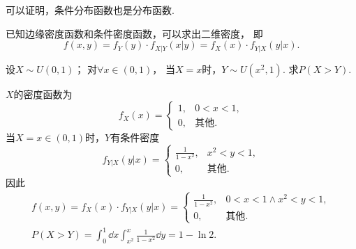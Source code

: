 可以证明，条件分布函数也是分布函数.

\begin{corollary}
已知边缘密度函数和条件密度函数，可以求出二维密度，
即\begin{equation*}
	f(x,y) = f_Y(y) \cdot f_{X \vert Y}(x \vert y)
	= f_X(x) \cdot f_{Y \vert X}(y \vert x).
\end{equation*}
\end{corollary}

\begin{example}
设\(X \sim U(0,1)\)；
对\(\forall x\in(0,1)\)，
当\(X=x\)时，\(Y \sim U(x^2,1)\).
求\(P(X > Y)\).
\begin{solution}
\(X\)的密度函数为\[
	f_X(x) = \left\{ \begin{array}{cl}
		1, & 0<x<1, \\
		0, & \text{其他}.
	\end{array} \right.
\]
当\(X=x\in(0,1)\)时，\(Y\)有条件密度\[
	f_{Y \vert X}(y \vert x)
	= \left\{ \begin{array}{cl}
		\frac{1}{1-x^2}, & x^2<y<1, \\
		0, & \text{其他}.
	\end{array} \right.
\]
因此\begin{gather*}
	f(x,y) = f_X(x) \cdot f_{Y \vert X}(y \vert x)
	= \left\{ \begin{array}{cl}
		\frac{1}{1-x^2}, & 0<x<1 \land x^2<y<1, \\
		0, & \text{其他}.
	\end{array} \right. \\
	P(X > Y)
	= \int_0^1 \dd{x} \int_{x^2}^x \frac{1}{1-x^2} \dd{y}
	= 1 - \ln2.
\end{gather*}
\end{solution}
\end{example}


